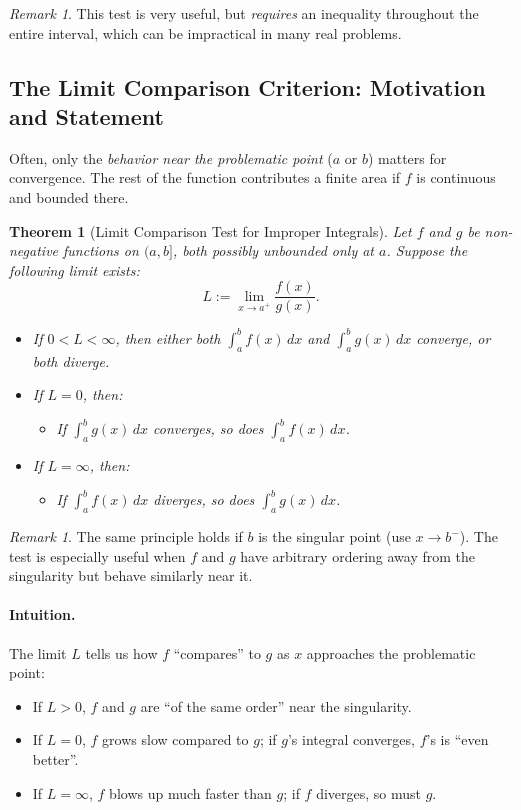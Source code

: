 \documentclass[12pt]{article}
\theoremstyle{definition}
\theoremstyle{plain}
\newtheorem{theorem}[definition]{Theorem}
\theoremstyle{remark}
\newtheorem{remark}[definition]{Remark}
\begin{document}
\begin{remark}
This test is very useful, but \emph{requires} an inequality throughout the entire interval, which can be impractical in many real problems.
\end{remark}

\subsection{The Limit Comparison Criterion: Motivation and Statement}

Often, only the \emph{behavior near the problematic point} ($a$ or $b$) matters for convergence. The rest of the function contributes a finite area if $f$ is continuous and bounded there.

\begin{theorem}[Limit Comparison Test for Improper Integrals]
Let $f$ and $g$ be non-negative functions on $(a, b]$, both possibly unbounded only at $a$. Suppose the following limit exists:
\[
L := \lim_{x \to a^+} \frac{f(x)}{g(x)}.
\]
\begin{itemize}
    \item If $0 < L < \infty$, then either both $\int_{a}^{b} f(x)\, dx$ and $\int_{a}^{b} g(x)\, dx$ converge, or both diverge.
    \item If $L = 0$, then:
        \begin{itemize}
            \item If $\int_{a}^{b} g(x)\, dx$ converges, so does $\int_{a}^{b} f(x)\, dx$.
        \end{itemize}
    \item If $L = \infty$, then:
        \begin{itemize}
            \item If $\int_{a}^{b} f(x)\, dx$ diverges, so does $\int_{a}^{b} g(x)\, dx$.
        \end{itemize}
\end{itemize}
\end{theorem}

\begin{remark}
The same principle holds if $b$ is the singular point (use $x \to b^-$). The test is especially useful when $f$ and $g$ have arbitrary ordering away from the singularity but behave similarly near it.
\end{remark}

\paragraph{Intuition.}
The limit $L$ tells us how $f$ ``compares'' to $g$ as $x$ approaches the problematic point:
\begin{itemize}
    \item If $L > 0$, $f$ and $g$ are ``of the same order'' near the singularity.
    \item If $L = 0$, $f$ grows slow compared to $g$; if $g$'s integral converges, $f$'s is ``even better''.
    \item If $L = \infty$, $f$ blows up much faster than $g$; if $f$ diverges, so must $g$.
\end{itemize}
\end{document}
